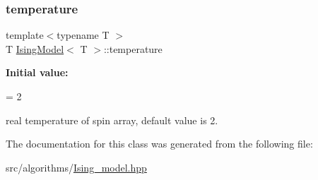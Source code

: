 \subsubsection{\texorpdfstring{temperature}{temperature}}
{\footnotesize\ttfamily template$<$typename T $>$ \\
T \mbox{\hyperlink{classIsingModel}{Ising\+Model}}$<$ T $>$\+::temperature\hspace{0.3cm}{\ttfamily [private]}}

{\bfseries Initial value\+:}
\begin{DoxyCode}
=
        2
\end{DoxyCode}
real temperature of spin array, default value is 2. 

The documentation for this class was generated from the following file\+:\begin{DoxyCompactItemize}
\item 
src/algorithms/\mbox{\hyperlink{Ising__model_8hpp}{Ising\+\_\+model.\+hpp}}\end{DoxyCompactItemize}
